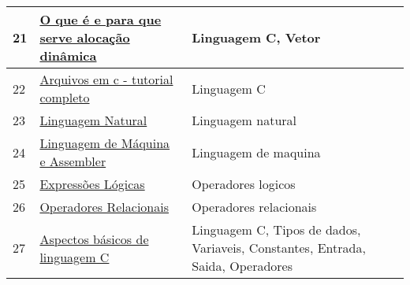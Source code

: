 \begin{longtable}{| p{} | p{} | p{} |}
21  & \href{http://www.cprogressivo.net/2013/03/O-que-e-alocacao-dinamica-de-memoria-em-Linguagem-C.html}{\color{blue} O que é e para que serve alocação dinâmica                                          } & Linguagem C, Vetor                                                                                                                                \\ \hline
22  & \href{http://www.cprogressivo.net/p/arquivos-em-c.html}{\color{blue} Arquivos em c - tutorial completo                                                   } & Linguagem C                                                                                                                                       \\ \hline
23  & \href{http://www.cristiancechinel.pro.br/my\_files/algorithms/bookhtml/node18.html}{\color{blue} Linguagem Natural                                                                   } & Linguagem natural                                                                                                                                 \\ \hline
24  & \href{http://www.cristiancechinel.pro.br/my\_files/algorithms/bookhtml/node19.html}{\color{blue} Linguagem de Máquina e Assembler                                                    } & Linguagem de maquina                                                                                                                              \\ \hline
25  & \href{http://www.cristiancechinel.pro.br/my\_files/algorithms/bookhtml/node43.html}{\color{blue} Expressões Lógicas                                                                  } & Operadores logicos                                                                                                                                \\ \hline
26  & \href{http://www.cristiancechinel.pro.br/my\_files/algorithms/bookhtml/node44.html}{\color{blue} Operadores Relacionais                                                              } & Operadores relacionais                                                                                                                            \\ \hline
27  & \href{http://www.dainf.cefetpr.br/~robson/prof/common/c/aspec.htm}{\color{blue} Aspectos básicos de linguagem C                                                     } & Linguagem C, Tipos de dados, Variaveis, Constantes, Entrada, Saida, Operadores                                                                    \\ \hline

\end{longtable}
